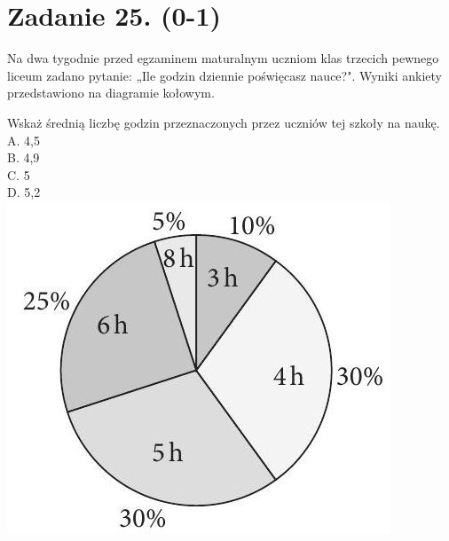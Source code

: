 \documentclass[10pt]{article}
\begin{document}
\section*{Zadanie 25. (0-1)}
Na dwa tygodnie przed egzaminem maturalnym uczniom klas trzecich pewnego liceum zadano pytanie: „Ile godzin dziennie poświęcasz nauce?". Wyniki ankiety przedstawiono na diagramie kołowym.

Wskaż średnią liczbę godzin przeznaczonych przez uczniów tej szkoły na naukę.\\
A. 4,5\\
B. 4,9\\
C. 5\\
D. 5,2\\
\includegraphics[max width=\textwidth, center]{2024_11_21_1e89351873aa60c4c1b9g-08}\\
\end{document}
